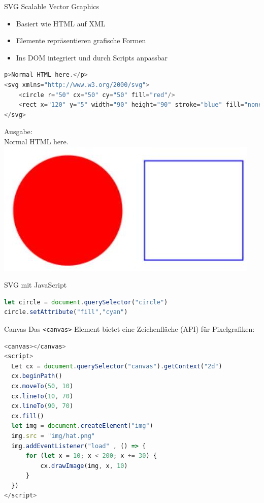 \begin{definition}{SVG}
Scalable Vector Graphics
\begin{itemize}
  \item Basiert wie HTML auf XML
  \item Elemente repräsentieren grafische Formen
  \item Ins DOM integriert und durch Scripts anpassbar
\end{itemize}
\begin{lstlisting}[language=JavaScript, style=basesmol]
p>Normal HTML here.</p>
<svg xmlns="http://www.w3.org/2000/svg">
    <circle r="50" cx="50" cy="50" fill="red"/>
    <rect x="120" y="5" width="90" height="90" stroke="blue" fill="none"/>
</svg>
\end{lstlisting}
Ausgabe:\\
Normal HTML here.\\
\includegraphics[width=\linewidth]{images/2024_12_29_858f09cde51177c71657g-27}
\end{definition}

\begin{examplecode}{SVG mit JavaScript}
\begin{lstlisting}[language=JavaScript, style=basesmol]
let circle = document.querySelector("circle")
circle.setAttribute("fill","cyan")
\end{lstlisting}
\end{examplecode}


\begin{definition}{Canvas}
  Das \texttt{<canvas>}-Element bietet eine Zeichenfläche (API) für Pixelgrafiken:
\begin{lstlisting}[language=JavaScript, style=basesmol]
<canvas></canvas>
<script>
  Let cx = document.querySelector("canvas").getContext("2d")
  cx.beginPath()
  cx.moveTo(50, 10)
  cx.lineTo(10, 70)
  cx.lineTo(90, 70)
  cx.fill()
  let img = document.createElement("img")
  img.src = "img/hat.png"
  img.addEventListener("load" , () => {
      for (let x = 10; x < 200; x += 30) {
          cx.drawImage(img, x, 10)
      }
  })
</script>
\end{lstlisting}
\end{definition}


